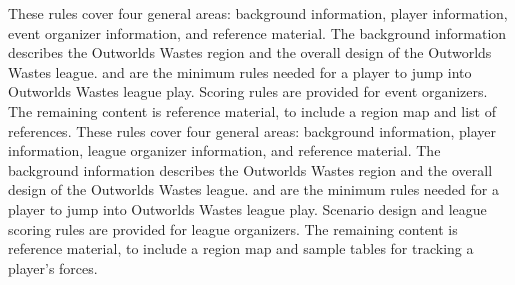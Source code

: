  {
These rules cover four general areas: background information, player information, event organizer information, and reference material.
The background information describes the Outworlds Wastes region and the overall design of the Outworlds Wastes league.
 and  are the minimum rules needed for a player to jump into Outworlds Wastes league play.
Scoring rules are provided for event organizers.
The remaining content is reference material, to include a region map and list of references.
} {
These rules cover four general areas: background information, player information, league organizer information, and reference material.
The background information describes the Outworlds Wastes region and the overall design of the Outworlds Wastes league.
 and  are the minimum rules needed for a player to jump into Outworlds Wastes league play.
Scenario design and league scoring rules are provided for league organizers.
The remaining content is reference material, to include a region map and sample tables for tracking a player's forces.
}
